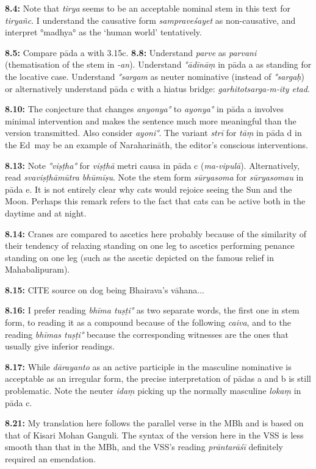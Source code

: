 \documentclass{article}
\newcommand{\vsnum}[1]{\textbf{#1}}
\newcommand{\skt}[1]{\textit{#1}}
\newcommand{\Ed}{Ed}
\begin{document}
\vsnum{8.4: }Note that \skt{tirya} seems to be an acceptable nominal stem in this text for \skt{tiryañc}. I understand the causative form \skt{sampraveśayet} as non-causative, and interpret °madhya° as the `human world' tentatively.

\vsnum{8.5: }Compare pāda a with 3.15c. \vsnum{8.8: }Understand \skt{parve} as \skt{parvani} (thematisation of the stem in \skt{-an}). Understand \skt{°ādīnāṃ} in pāda a as standing for the locative case. Understand \skt{°sargam} as neuter nominative (instead of \skt{°sargaḥ}) or alternatively understand pāda c with a hiatus bridge: \skt{garhitotsarga-m-ity etad}.

\vsnum{8.10: }The conjecture that changes \skt{anyonya°} to \skt{ayonya°} in pāda a involves minimal intervention and makes the sentence much more meaningful than the version transmitted. Also consider \skt{ayoni°}. The variant \skt{strī} for \skt{tāṃ} in pāda d in the \Ed\ may be an example of Naraharināth, the editor's conscious interventions.

\vsnum{8.13: }Note \skt{°viṣṭha°} for \skt{viṣṭhā} metri causa in pāda c (\skt{ma-vipulā}). Alternatively, read \skt{svaviṣṭhāmūtra bhūmīṣu}. Note the stem form \skt{sūryasoma} for \skt{sūryasomau} in pāda e. It is not entirely clear why cats would rejoice seeing the Sun and the Moon. Perhaps this remark refers to the fact that cats can be active both in the daytime and at night.

\vsnum{8.14: }Cranes are compared to ascetics here probably because of the similarity of their tendency of relaxing standing on one leg to ascetics performing penance standing on one leg (such as the ascetic depicted on the famous relief in Mahabalipuram). 

\vsnum{8.15: }CITE source on dog being Bhairava's vāhana...

\vsnum{8.16: }I prefer reading \skt{bhīma tuṣṭi°} as two separate words, the first one in stem form, to reading it as a compound because of the following \skt{caiva}, and to the reading \skt{bhīmas tuṣṭi°} because the corresponding witnesses are the ones that usually give inferior readings.

\vsnum{8.17: }While \skt{dārayanto} as an active participle in the masculine nominative is acceptable as an irregular form, the precise interpretation of pādas a and b is still problematic. Note the neuter \skt{idaṃ} picking up the normally masculine \skt{lokaṃ} in pāda c.

\vsnum{8.21: }My translation here follows the parallel verse in the MBh and is based on that of Kisari Mohan Ganguli. The syntax of the version here in the VSS is less smooth than that in the MBh, and the VSS's reading \skt{prāntarāśī} definitely required an emendation.
\end{document}
